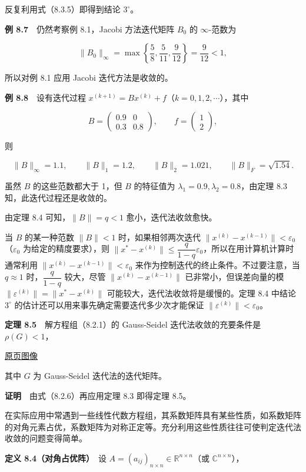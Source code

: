 \documentclass[
  10pt,
  fontset=fandol]{ctexart}
\begin{document}
反复利用式（8.3.5）即得到结论 \(3^\circ\)。

\textbf{例 8.7}　仍然考察例 8.1，Jacobi 方法迭代矩阵 \(B_0\) 的 \(\infty\)-范数为

\[
\|B_0\|_\infty=\max\left\{\frac58,\frac5{11},\frac9{12}\right\}=\frac9{12}<1,
\]

所以对例 8.1 应用 Jacobi 迭代方法是收敛的。

\textbf{例 8.8}　设有迭代过程 \(x^{(k+1)}=Bx^{(k)}+f\)（\(k=0,1,2,\cdots\)），其中

\[
B=\begin{pmatrix}0.9&0\\0.3&0.8\end{pmatrix},\qquad f=\begin{pmatrix}1\\2\end{pmatrix},
\]

则

\[
\|B\|_\infty=1.1,\qquad\|B\|_1=1.2,\qquad\|B\|_2=1.021,\qquad\|B\|_F=\sqrt{1.54}.
\]

虽然 \(B\) 的这些范数都大于 1，但 \(B\) 的特征值为 \(\lambda_1=0.9,\lambda_2=0.8\)，由定理 8.3 知，此迭代过程还是收敛的。

由定理 8.4 可知，\(\|B\|=q<1\) 愈小，迭代法收敛愈快。

当 \(B\) 的某一种范数 \(\|B\|<1\) 时，如果相邻两次迭代 \(\|x^{(k)}-x^{(k-1)}\|<\varepsilon_0\)（\(\varepsilon_0\) 为给定的精度要求），则 \(\|x^*-x^{(k)}\|\leqslant\dfrac{q}{1-q}\varepsilon_0\)，所以在用计算机计算时通常利用 \(\|x^{(k)}-x^{(k-1)}\|<\varepsilon_0\) 来作为控制迭代的终止条件。不过要注意，当 \(q\approx1\) 时，\(\dfrac{q}{1-q}\) 较大，尽管 \(\|x^{(k)}-x^{(k-1)}\|\) 已非常小，但误差向量的模 \(\|\varepsilon^{(k)}\|=\|x^*-x^{(k)}\|\) 可能较大，迭代法收敛将是缓慢的。定理 8.4 中结论 \(3^\circ\) 的估计还可以用来事先确定需要迭代多少次才能保证 \(\|\varepsilon^{(k)}\|<\varepsilon_0\)。

\textbf{定理 8.5}　解方程组（8.2.1）的 Gauss-Seidel 迭代法收敛的充要条件是 \(\rho(G)<1\)，

\href{../../source-images/pdf-224.jpeg}{原页图像}

其中 \(G\) 为 Gauss-Seidel 迭代法的迭代矩阵。

\textbf{证明}　由式（8.2.6）再应用定理 8.3 即得定理 8.5。

在实际应用中常遇到一些线性代数方程组，其系数矩阵具有某些性质，如系数矩阵的对角元素占优，系数矩阵为对称正定等。充分利用这些性质往往可使判定迭代法收敛的问题变得简单。

\textbf{定义 8.4（对角占优阵）}　设 \(A=(a_{ij})_{n\times n}\in\mathbb R^{n\times n}\)（或 \(\mathbb C^{n\times n}\)），
\end{document}
